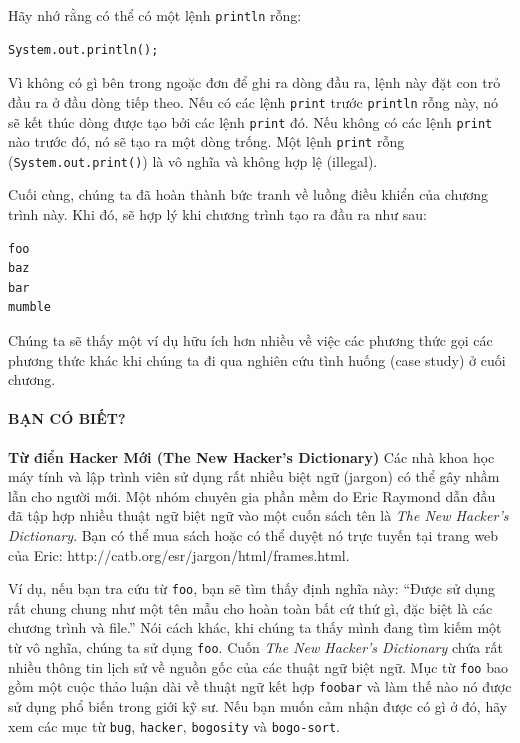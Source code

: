 Hãy nhớ rằng có thể có một lệnh \texttt{println} rỗng:

\begin{verbatim}
System.out.println();
\end{verbatim}

Vì không có gì bên trong ngoặc đơn để ghi ra dòng đầu ra, lệnh này đặt
con trỏ đầu ra ở đầu dòng tiếp theo. Nếu có các lệnh \texttt{print}
trước \texttt{println} rỗng này, nó sẽ kết thúc dòng được tạo bởi các
lệnh \texttt{print} đó. Nếu không có các lệnh \texttt{print} nào trước
đó, nó sẽ tạo ra một dòng trống. Một lệnh \texttt{print} rỗng
(\texttt{System.out.print()}) là vô nghĩa và không hợp lệ (illegal).

Cuối cùng, chúng ta đã hoàn thành bức tranh về luồng điều khiển của
chương trình này. Khi đó, sẽ hợp lý khi chương trình tạo ra đầu ra như
sau:

\begin{verbatim}
foo 
baz 
bar 
mumble
\end{verbatim}

Chúng ta sẽ thấy một ví dụ hữu ích hơn nhiều về việc các phương thức gọi
các phương thức khác khi chúng ta đi qua nghiên cứu tình huống (case
study) ở cuối chương.

\paragraph{BẠN CÓ BIẾT?}\label{bux1ea1n-cuxf3-biux1ebft}

\textbf{Từ điển Hacker Mới (The New Hacker's Dictionary)} Các nhà khoa
học máy tính và lập trình viên sử dụng rất nhiều biệt ngữ (jargon) có
thể gây nhầm lẫn cho người mới. Một nhóm chuyên gia phần mềm do Eric
Raymond dẫn đầu đã tập hợp nhiều thuật ngữ biệt ngữ vào một cuốn sách
tên là \emph{The New Hacker's Dictionary}. Bạn có thể mua sách hoặc có
thể duyệt nó trực tuyến tại trang web của Eric:
http://catb.org/esr/jargon/html/frames.html.

Ví dụ, nếu bạn tra cứu từ \texttt{foo}, bạn sẽ tìm thấy định nghĩa này:
``Được sử dụng rất chung chung như một tên mẫu cho hoàn toàn bất cứ thứ
gì, đặc biệt là các chương trình và file.'' Nói cách khác, khi chúng ta
thấy mình đang tìm kiếm một từ vô nghĩa, chúng ta sử dụng \texttt{foo}.
Cuốn \emph{The New Hacker's Dictionary} chứa rất nhiều thông tin lịch sử
về nguồn gốc của các thuật ngữ biệt ngữ. Mục từ \texttt{foo} bao gồm một
cuộc thảo luận dài về thuật ngữ kết hợp \texttt{foobar} và làm thế nào
nó được sử dụng phổ biến trong giới kỹ sư. Nếu bạn muốn cảm nhận được có
gì ở đó, hãy xem các mục từ \texttt{bug}, \texttt{hacker},
\texttt{bogosity} và \texttt{bogo-sort}.

